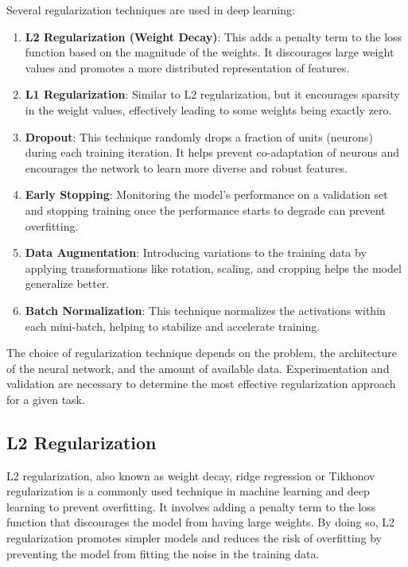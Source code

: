 \documentclass{report}
\begin{document}
Several regularization techniques are used in deep learning:
\begin{enumerate}
\item \textbf{L2 Regularization (Weight Decay)}: This adds a penalty term to the loss function based on the magnitude of the weights. It discourages large weight values and promotes a more distributed representation of features.

\item \textbf{L1 Regularization}: Similar to L2 regularization, but it encourages sparsity in the weight values, effectively leading to some weights being exactly zero.

\item \textbf{Dropout}: This technique randomly drops a fraction of units (neurons) during each training iteration. It helps prevent co-adaptation of neurons and encourages the network to learn more diverse and robust features.

\item \textbf{Early Stopping}: Monitoring the model's performance on a validation set and stopping training once the performance starts to degrade can prevent overfitting.

\item \textbf{Data Augmentation}: Introducing variations to the training data by applying transformations like rotation, scaling, and cropping helps the model generalize better.

\item \textbf{Batch Normalization}: This technique normalizes the activations within each mini-batch, helping to stabilize and accelerate training.
\end{enumerate}

The choice of regularization technique depends on the problem, the architecture of the neural network, and the amount of available data. Experimentation and validation are necessary to determine the most effective regularization approach for a given task.

\subsection{L2 Regularization}
L2 regularization, also known as weight decay, ridge regression or Tikhonov regularization is a commonly used technique in machine learning and deep learning to prevent overfitting. It involves adding a penalty term to the loss function that discourages the model from having large weights. By doing so, L2 regularization promotes simpler models and reduces the risk of overfitting by preventing the model from fitting the noise in the training data.
\end{document}
